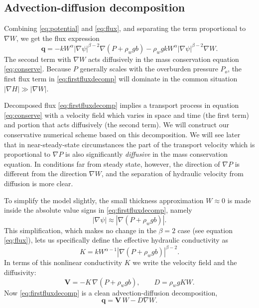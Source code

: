 \documentclass[11pt,final]{amsart}
\newcommand\bV{\mathbf{V}}
\newcommand\bq{\mathbf{q}}
\newcommand{\grad}{\nabla}
\begin{document}
\subsection*{Advection-diffusion decomposition}  Combining \eqref{eq:potential} and \eqref{eq:flux}, and separating the term proportional to $\grad W$, we get the flux expression
\begin{equation}
  \bq = - k  W^\alpha \left|\grad \psi\right|^{\beta-2} \grad \left(P + \rho_w g b\right)   - \rho_w g k W^\alpha \left|\grad \psi\right|^{\beta-2} \grad W. \label{eq:firstfluxdecomp}
\end{equation}
The second term with $\grad W$ acts diffusively in the mass conservation equation \eqref{eq:conserve}.  Because $P$ generally scales with the overburden pressure $P_o$, the first flux term in \eqref{eq:firstfluxdecomp} will dominate in the common situation $|\grad H| \gg |\grad W|$.

Decomposed flux \eqref{eq:firstfluxdecomp} implies a transport process in equation \eqref{eq:conserve} with a velocity field which varies in space and time (the first term) and portion that acts diffusively (the second term).  We will construct our conservative numerical scheme based on this decomposition.  We will see later that in near-steady-state circumstances the part of the transport velocity which is proportional to $\grad P$ is also significantly \emph{diffusive} in the mass conservation equation.  In conditions far from steady state, however, the direction of $\grad P$ is different from the direction $\grad W$, and the separation of hydraulic velocity from diffusion is more clear.

To simplify the model slightly, the small thickness approximation $W\approx 0$ is made inside the absolute value signs in \eqref{eq:firstfluxdecomp}, namely
\begin{equation}
\left|\grad \psi\right| \approx \left|\grad \left(P + \rho_w g b \right)\right|.  \label{eq:Wsmall}
\end{equation}
This simplification, which makes no change in the $\beta=2$ case (see equation \eqref{eq:flux}), lets us specifically define the effective hydraulic conductivity as
\begin{equation}
K = k W^{\alpha-1} \left|\grad(P+\rho_w g b)\right|^{\beta - 2}. \label{eq:Kdefine}
\end{equation}
In terms of this nonlinear conductivity $K$ we write the velocity field and the diffusivity:
\begin{equation} \label{eq:vexpression}
  \bV = - K\, \grad \left(P + \rho_w g b\right), \qquad D = \rho_w g K W.
\end{equation}
Now \eqref{eq:firstfluxdecomp} is a clean advection-diffusion decomposition,
\begin{equation} \label{eq:qexpression}
  \bq = \bV\, W - D \grad W.
\end{equation}
\end{document}
